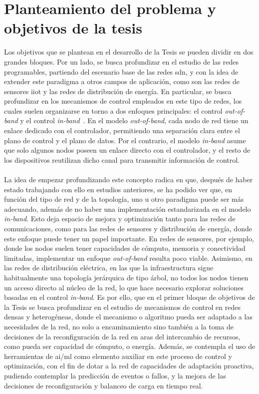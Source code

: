 \section{Planteamiento del problema y objetivos de la tesis}

Los objetivos que se plantean en el desarrollo de la Tesis se pueden dividir en dos grandes bloques. Por un lado, se busca profundizar en el estudio de las redes programables, partiendo del escenario base de las redes \gls{sdn}, y con la idea de extender este paradigma a otros campos de aplicación, como son las redes de sensores \gls{iiot} y las redes de distribución de energía. En particular, se busca profundizar en los mecanismos de control empleados en este tipo de redes, los cuales suelen organizarse en torno a dos enfoques principales: el control \textit{out-of-band} y el control \textit{in-band}~\cite{carrascal2023comprehensive}. En el modelo \textit{out-of-band}, cada nodo de red tiene un enlace dedicado con el controlador, permitiendo una separación clara entre el plano de control y el plano de datos. Por el contrario, el modelo \textit{in-band} asume que solo algunos nodos poseen un enlace directo con el controlador, y el resto de los dispositivos reutilizan dicho canal para transmitir información de control.\\
\\
La idea de empezar profundizando este concepto radica en que, después de haber estado trabajando con ello en estudios anteriores, se ha podido ver que, en función del tipo de red y de la topología, uno u otro paradigma puede ser más adecuando, además de no haber una implementación estandarizada en el modelo \textit{in-band}. Esto deja espacio de mejora y optimización tanto para las redes de comunicaciones, como para las redes de sensores y distribución de energía, donde este enfoque puede tener un papel importante. En redes de sensores, por ejemplo, donde los nodos suelen tener capacidades de cómputo, memoria y conectividad limitadas, implementar un enfoque \textit{out-of-band} resulta poco viable. Asimismo, en las redes de distribución eléctrica, en las que la infraestructura sigue habitualmente una topología jerárquica de tipo árbol, no todos los nodos tienen un acceso directo al núcleo de la red, lo que hace necesario explorar soluciones basadas en el control \textit{in-band}. Es por ello, que en el primer bloque de objetivos de la Tesis se busca profundizar en el estudio de mecanismos de control en redes densas y heterogéneas, donde el mecanismo o algoritmo pueda ser adaptado a las necesidades de la red, no solo a encaminamiento sino también a la toma de decisiones de la reconfiguración de la red en aras del intercambio de recursos, como pueda ser capacidad de cómputo, o energía. Además, se contempla el uso de herramientas de \gls{ai}/\gls{ml} como elemento auxiliar en este proceso de control y optimización, con el fin de dotar a la red de capacidades de adaptación proactiva, pudiendo contemplar la predicción de eventos o fallos, y la mejora de las decisiones de reconfiguración y balanceo de carga en tiempo real.\\
